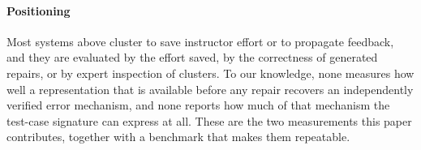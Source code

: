 \paragraph{Positioning}
Most systems above cluster to save instructor effort or to propagate feedback, and they are evaluated by the effort saved, by the correctness of generated repairs, or by expert inspection of clusters. To our knowledge, none measures how well a representation that is available before any repair recovers an independently verified error mechanism, and none reports how much of that mechanism the test-case signature can express at all. These are the two measurements this paper contributes, together with a benchmark that makes them repeatable.
